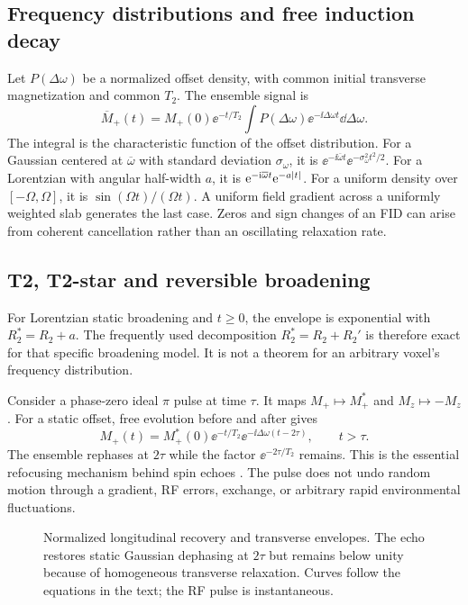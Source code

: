 \subsection{Frequency distributions and free induction decay}
Let $P(\Delta\omega)$ be a normalized offset density, with common
initial transverse magnetization and common $T_2$. The ensemble signal is
\begin{equation}
 \overline M_+(t)=M_+(0)\ee^{-t/T_2}
       \int P(\Delta\omega)\ee^{-\ii\Delta\omega t}\dd\Delta\omega .
 \label{eq:03:ensemble}
\end{equation}
The integral is the characteristic function of the offset distribution.
For a Gaussian centered at $\overline\omega$ with standard deviation
$\sigma_\omega$, it is
$\ee^{-\ii\overline\omega t}\ee^{-\sigma_\omega^2t^2/2}$.
For a Lorentzian with angular half-width $a$, it is
$\mathrm{e}^{-\mathrm{i}\overline\omega t}\mathrm{e}^{-a\lvert t\rvert}$.
For a uniform density over $[-\Omega,\Omega]$, it is
$\sin(\Omega t)/(\Omega t)$.
A uniform field gradient across a uniformly weighted slab generates the
last case. Zeros and sign changes of an FID can arise from coherent
cancellation rather than an oscillating relaxation rate.

\subsection{T2, T2-star and reversible broadening}
For Lorentzian static broadening and $t\geq0$, the envelope is exponential
with $R_2^*=R_2+a$. The frequently used decomposition
$R_2^*=R_2+R_2'$ is therefore exact for that specific broadening model.
It is not a theorem for an arbitrary voxel's frequency distribution.

Consider a phase-zero ideal $\pi$ pulse at time $\tau$.
It maps $M_+\mapsto M_+^*$ and $M_z\mapsto-M_z$.
For a static offset, free evolution before and after gives
\begin{equation}
 M_+(t)=M_+^*(0)\ee^{-t/T_2}
       \ee^{-\ii\Delta\omega(t-2\tau)},\qquad t>\tau .
 \label{eq:03:echo}
\end{equation}
The ensemble rephases at $2\tau$ while the factor $\ee^{-2\tau/T_2}$
remains. This is the essential refocusing mechanism behind spin echoes
\cite{hahn1950}. The pulse does not undo random motion through a gradient,
RF errors, exchange, or arbitrary rapid environmental fluctuations.

\begin{figure}[tb]
 \centering
 \caption{Normalized longitudinal recovery and transverse envelopes.
 The echo restores static Gaussian dephasing at $2\tau$ but remains
 below unity because of homogeneous transverse relaxation.
 Curves follow the equations in the text; the RF pulse is instantaneous.}
 \label{fig:03:relaxation}
\end{figure}

